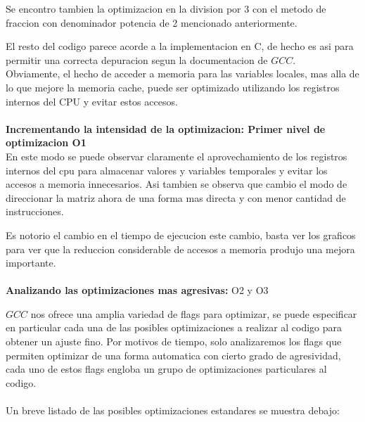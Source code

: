 Se encontro tambien la optimizacion en la division por 3 con el metodo de fraccion con denominador potencia de 2 mencionado anteriormente.

El resto del codigo parece acorde a la implementacion en C, de hecho es asi para permitir una correcta depuracion segun la documentacion de $GCC$.\\

Obviamente, el hecho de acceder a memoria para las variables locales, mas alla de lo que mejore la memoria cache, puede ser optimizado utilizando los registros internos del CPU y evitar estos accesos.\\
\\
\textbf{Incrementando la intensidad de la optimizacion: Primer nivel de optimizacion O1 }\\

En este modo se puede observar claramente el aprovechamiento de los registros internos del cpu para almacenar valores y variables temporales y evitar los accesos a memoria innecesarios. Asi tambien se observa que cambio el modo de direccionar la matriz ahora de una forma mas directa y con menor cantidad de instrucciones.

Es notorio el cambio en el tiempo de ejecucion este cambio, basta ver los graficos para ver que la reduccion considerable de accesos a memoria produjo una mejora importante.
\\
\\
\textbf{Analizando las optimizaciones mas agresivas:} O2 y O3\\
\par
$GCC$ nos ofrece una amplia variedad de flags para optimizar, se puede especificar en particular cada una de las posibles optimizaciones a realizar al codigo para obtener un ajuste fino. Por motivos de tiempo, solo analizaremos los flags que permiten optimizar de una forma automatica con cierto grado de agresividad, cada uno de estos flags engloba un grupo de optimizaciones particulares al codigo.
\\
\\
Un breve listado de las posibles optimizaciones estandares se muestra debajo:\\

